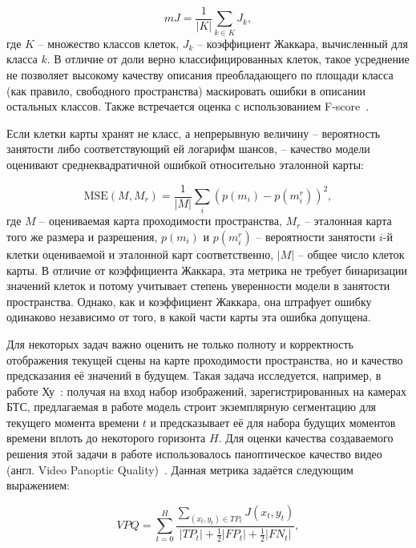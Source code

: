 \begin{equation}
	mJ = \dfrac{1}{|K|}\sum_{k\in K}J_k,
	\label{eq:mj}
\end{equation}
где $K$ -- множество классов клеток, $J_k$ -- коэффициент Жаккара, вычисленный для класса $k$. В отличие от доли верно классифицированных клеток, такое усреднение не позволяет высокому качеству описания преобладающего по площади класса (как правило, свободного пространства) маскировать ошибки в описании остальных классов. Также встречается оценка с использованием F-score~\cite{matsushita2025machine}.

Если клетки карты хранят не класс, а непрерывную величину -- вероятность занятости либо соответствующий ей логарифм шансов, -- качество модели оценивают среднеквадратичной ошибкой относительно эталонной карты:

\begin{equation}
	\text{MSE}(M, M_r) = \dfrac{1}{|M|}\sum_{i}\left(p(m_i) - p(m_i^r)\right)^2,
	\label{eq:map_mse}
\end{equation}
где $M$ -- оцениваемая карта проходимости пространства, $M_r$ -- эталонная карта того же размера и разрешения, $p(m_i)$ и $p(m_i^r)$ -- вероятности занятости $i$-й клетки оцениваемой и эталонной карт соответственно, $|M|$ -- общее число клеток карты. В отличие от коэффициента Жаккара, эта метрика не требует бинаризации значений клеток и потому учитывает степень уверенности модели в занятости пространства. Однако, как и коэффициент Жаккара, она штрафует ошибку одинаково независимо от того, в какой части карты эта ошибка допущена.

Для некоторых задач важно оценить не только полноту и корректность отображения текущей сцены на карте проходимости пространства, но и качество предсказания её значений в будущем. Такая задача исследуется, например, в работе Ху~\cite{hu2021fiery}: получая на вход набор изображений, зарегистрированных на камерах БТС, предлагаемая в работе модель строит экземплярную сегментацию для текущего момента времени $t$ и предсказывает её для набора будущих моментов времени вплоть до некоторого горизонта $H$. Для оценки качества создаваемого решения этой задачи в работе использовалось паноптическое качество видео (англ. Video Panoptic Quality)~\cite{kim2020video}. Данная метрика задаётся следующим выражением:

\begin{equation}
	VPQ = \sum_{t=0}^{H} \dfrac{\sum_{(x_t, y_t)\in TP_t} J(x_t, y_t)}{|TP_t| + \frac{1}{2}|FP_t| + \frac{1}{2}|FN_t|},
	\label{eq:vpq}
\end{equation}

